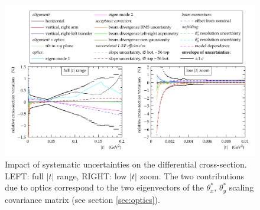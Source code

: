 \begin{figure}
\begin{center}
\includegraphics[width=18cm]{fig/systematic_uncertainties.pdf}
\caption{%
Impact of systematic uncertainties on the differential cross-section. 
LEFT: full $|t|$ range, RIGHT: low $|t|$ zoom.
The two contributions due to optics correspond to the two eigenvectors of the $\theta_x^*$, $\theta_y^*$ scaling covariance matrix (see section \ref{sec:optics}).
}
\label{fig:syst unc}
\end{center}
\end{figure}
